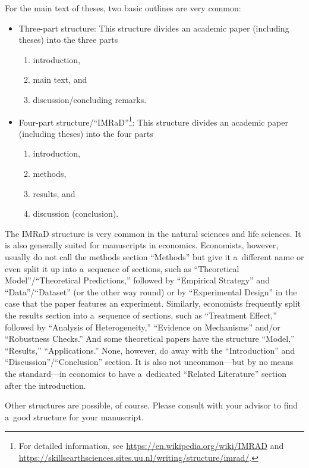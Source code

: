 \documentclass[12pt, a4paper, oneside]{article}
\theoremstyle{Plain}
\theoremstyle{Definition}
\theoremstyle{Remark}
\begin{document}
For the main text of theses, two basic outlines are very common:
\begin{itemize}
	\item Three-part structure: This structure divides an academic paper (including theses) into the three parts
		\begin{enumerate}
			\item introduction,
			\item main text, and
			\item discussion/concluding remarks.
		\end{enumerate}
	\item Four-part structure/``IMRaD''\footnote{For detailed information, see \url{https://en.wikipedia.org/wiki/IMRAD} and \url{https://skillsearthsciences.sites.uu.nl/writing/structure/imrad/}.}: This structure divides an academic paper (including theses) into the four parts
		\begin{enumerate}
			\item introduction,
			\item methods,
			\item results, and
			\item discussion (conclusion).
		\end{enumerate}
\end{itemize}

The IMRaD structure is very common in the natural sciences and life sciences. It is also generally suited for manuscripts in economics. Economists, however, usually do not call the methods section ``Methods'' but give it a~different name or even split it up into a~sequence of sections, such as ``Theoretical Model''\slash ``Theoretical Predictions,'' followed by ``Empirical Strategy'' and ``Data''\slash ``Dataset'' (or the other way round) or by ``Experimental Design'' in the case that the paper features an experiment. Similarly, economists frequently split the results section into a~sequence of sections, such as ``Treatment Effect,'' followed by ``Analysis of Heterogeneity,'' ``Evidence on Mechanisms'' and\slash or ``Robustness Checks.'' And some theoretical papers have the structure ``Model,'' ``Results,'' ``Applications.'' None, however, do away with the ``Introduction'' and ``Discussion''\slash ``Conclusion'' section. It is also not uncommon---but by no means the standard---in economics to have a~dedicated ``Related Literature'' section after the intro\-duction.

Other structures are possible, of course. Please consult with your advisor to find a~good structure for your manuscript.
\end{document}
